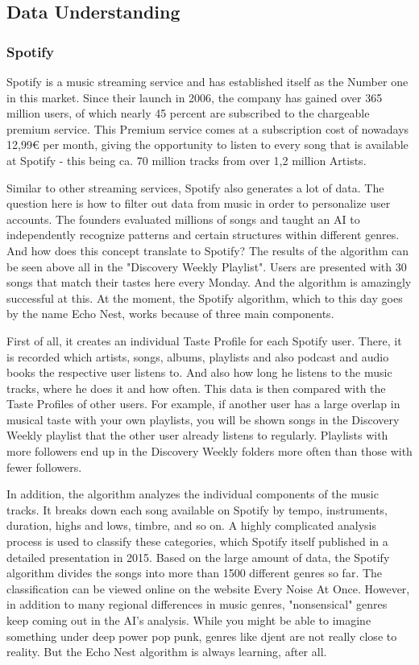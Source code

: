 \subsection{Data Understanding}

\subsubsection{Spotify}
Spotify is a music streaming service and has established itself as the Number one in this market. 
Since their launch in 2006, the company has gained over 365 million users, of which nearly 45 percent
are subscribed to the chargeable premium service. 
This Premium service comes at a subscription cost of nowadays 12,99€ per month,
giving the opportunity to listen to every song that is available at Spotify - this being
ca. 70 million tracks from over 1,2 million Artists.

Similar to other streaming services, Spotify also generates a lot of data.
The question here is how to filter out data from music in order to personalize user accounts. 
The founders evaluated millions of songs and taught an AI to independently recognize
patterns and certain structures within different genres. 
And how does this concept translate to Spotify?
The results of the algorithm can be seen above all in the "Discovery Weekly Playlist". 
Users are presented with 30 songs that match their tastes here every Monday.
And the algorithm is amazingly successful at this. 
At the moment, the Spotify algorithm, which to this day goes by the name Echo Nest,
works because of three main components. 

First of all, it creates an individual Taste Profile for each Spotify user. 
There, it is recorded which artists, songs, albums, playlists and also podcast and audio books the
respective user listens to. 
And also how long he listens to the music tracks, where he does it and how often.
This data is then compared with the Taste Profiles of other users. 
For example, if another user has a large overlap in musical taste with your own playlists,
you will be shown songs in the Discovery Weekly playlist that the other user already listens to regularly.
Playlists with more followers end up in the Discovery Weekly folders more often than those with
fewer followers. 

In addition, the algorithm analyzes the individual components of the music tracks. 
It breaks down each song available on Spotify by tempo, instruments, duration, highs and lows,
timbre, and so on. 
A highly complicated analysis process is used to classify these categories,
which Spotify itself published in a detailed presentation in 2015. 
Based on the large amount of data, the Spotify algorithm divides the songs into more than 1500
different genres so far. 
The classification can be viewed online on the website Every Noise At Once.
However, in addition to many regional differences in music genres, "nonsensical" genres keep
coming out in the AI's analysis. While you might be able to imagine something under deep power pop punk,
genres like djent are not really close to reality. 
But the Echo Nest algorithm is always learning, after all. 

